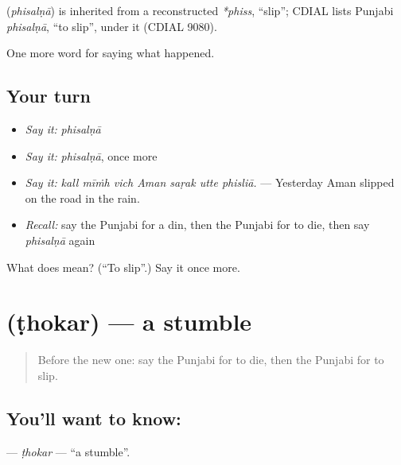 \begin{cousinweb}
\textbf{} (\emph{phisalṇā}) is inherited from a reconstructed \emph{*phiss}, \textquotedblleft{}slip\textquotedblright{}; CDIAL lists Punjabi \emph{phisalṇā}, \textquotedblleft{}to slip\textquotedblright{}, under it (CDIAL 9080).
\end{cousinweb}

\begin{grammarlens}[title={What you've built}]
One more word for saying what happened.
\end{grammarlens}

\subsection*{Your turn}
\begin{itemize}
\raggedright
  \item \emph{Say it:} \emph{phisalṇā}
  \item \emph{Say it:} \emph{phisalṇā}, once more
  \item \emph{Say it:} \emph{kall mīṁh vich Aman saṛak utte phisliā.} — Yesterday Aman slipped on the road in the rain.
  \item \emph{Recall:} say the Punjabi for a din, then the Punjabi for to die, then say \emph{phisalṇā} again
\end{itemize}

\begin{tcolorbox}[breakable,colback=teal!4,colframe=teal!35!black,title={Before you move on}]
What does  mean? (\textquotedblleft{}To slip\textquotedblright{}.) Say it once more.
\end{tcolorbox}
\section[\texorpdfstring{\pa{ਠੋਕਰ} (ṭhokar)}{ਠੋਕਰ (ṭhokar)}]{ (ṭhokar) — a stumble}

\label{lesson:PA-C310-thokar}



\begin{quote}
Before the new one: say the Punjabi for to die, then the Punjabi for to slip.
\end{quote}

\subsection*{You'll want to know: }
\textbf{} — \emph{ṭhokar} — \textquotedblleft{}a stumble\textquotedblright{}.

